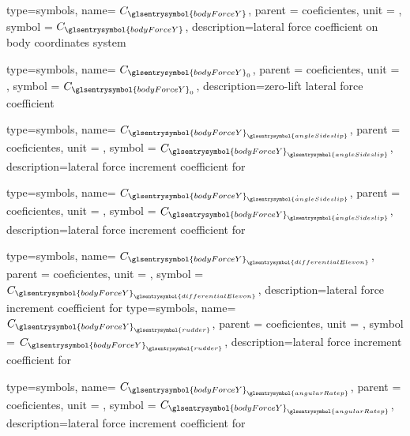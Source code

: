 {type=symbols,
    name= \ensuremath{C_{\glsentrysymbol{bodyForceY}}},
    parent = {coeficientes},
    unit = \unexpanded{},
    symbol = \ensuremath{C_{\glsentrysymbol{bodyForceY}}},
    description={lateral force coefficient on body coordinates system }
}

{type=symbols,
    name= \ensuremath{C_{\glsentrysymbol{bodyForceY}_{0}}},
    parent = {coeficientes},
    unit = \unexpanded{},
    symbol = \ensuremath{C_{\glsentrysymbol{bodyForceY}_{0}}},
    description={zero-lift lateral force coefficient}
}

{type=symbols,
    name= \ensuremath{C_{{\glsentrysymbol{bodyForceY}}_{\glsentrysymbol{angleSideslip}}}},
    parent = {coeficientes},
    unit = \unexpanded{},
    symbol = \ensuremath{C_{{\glsentrysymbol{bodyForceY}}_{\glsentrysymbol{angleSideslip}}}},
    description={lateral force increment coefficient for }
}

{type=symbols,
    name= \ensuremath{C_{{\glsentrysymbol{bodyForceY}}_{\dot{\glsentrysymbol{angleSideslip}}}}},
    parent = {coeficientes},
    unit = \unexpanded{},
    symbol = \ensuremath{C_{{\glsentrysymbol{bodyForceY}}_{\dot{\glsentrysymbol{angleSideslip}}}}},
    description={lateral force increment coefficient for }
}



{type=symbols,
    name= \ensuremath{C_{{\glsentrysymbol{bodyForceY}}_{\glsentrysymbol{differentialElevon}}}},
    parent = {coeficientes},
    unit = \unexpanded{},
    symbol = \ensuremath{C_{{\glsentrysymbol{bodyForceY}}_{\glsentrysymbol{differentialElevon}}}},
    description={lateral force increment coefficient for }
}
{type=symbols,
    name= \ensuremath{C_{{\glsentrysymbol{bodyForceY}}_{\glsentrysymbol{rudder}}}},
    parent = {coeficientes},
    unit = \unexpanded{},
    symbol = \ensuremath{C_{{\glsentrysymbol{bodyForceY}}_{\glsentrysymbol{rudder}}}},
    description={lateral force increment coefficient for }
}

{type=symbols,
    name= \ensuremath{C_{{\glsentrysymbol{bodyForceY}}_{\glsentrysymbol{angularRatep}}}},
    parent = {coeficientes},
    unit = \unexpanded{},
    symbol = \ensuremath{C_{{\glsentrysymbol{bodyForceY}}_{\glsentrysymbol{angularRatep}}}},
    description={lateral force increment coefficient for }
}


